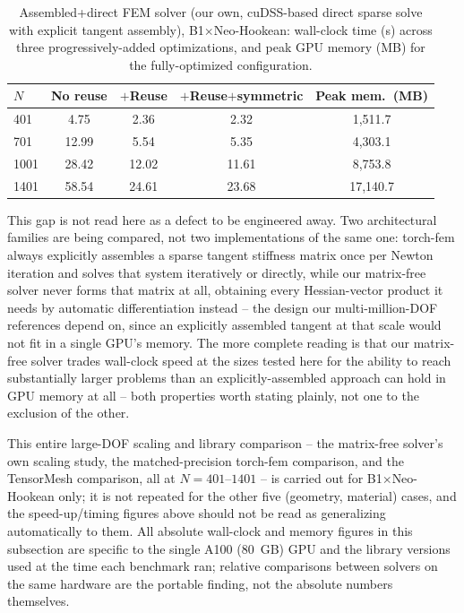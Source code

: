 \documentclass[final,5p,times]{elsarticle}
\begin{document}
\begin{table}[h]
\centering
\caption{Assembled+direct FEM solver (our own, cuDSS-based direct sparse
  solve with explicit tangent assembly), B1$\times$Neo-Hookean: wall-clock
  time (s) across three progressively-added optimizations, and peak GPU
  memory (MB) for the fully-optimized configuration.}
\label{tab:assembled-direct}
\footnotesize
\setlength{\tabcolsep}{3pt}
\begin{tabular}{lcccc}
\toprule
$N$ & No reuse & $+$Reuse & $+$Reuse$+$symmetric & Peak mem.\ (MB) \\
\midrule
401  & 4.75  & 2.36  & 2.32  & 1{,}511.7 \\
701  & 12.99 & 5.54  & 5.35  & 4{,}303.1 \\
1001 & 28.42 & 12.02 & 11.61 & 8{,}753.8 \\
1401 & 58.54 & 24.61 & 23.68 & 17{,}140.7 \\
\bottomrule
\end{tabular}
\end{table}

This gap is not read here as a defect to be engineered away. Two
architectural families are being compared, not two implementations of the
same one: torch-fem always explicitly assembles a sparse tangent
stiffness matrix once per Newton iteration and solves that system
iteratively or directly, while our matrix-free solver never forms that
matrix at all, obtaining every Hessian-vector product it needs by
automatic differentiation instead -- the design our
multi-million-DOF references depend on, since an explicitly assembled
tangent at that scale would not fit in a single GPU's memory. The more
complete reading is that our matrix-free solver trades wall-clock speed
at the sizes tested here for the ability to reach substantially larger
problems than an explicitly-assembled approach can hold in GPU memory at
all -- both properties worth stating plainly, not one to the exclusion of
the other.

This entire large-DOF scaling and library comparison -- the matrix-free
solver's own scaling study, the matched-precision torch-fem comparison,
and the TensorMesh comparison, all at $N{=}401$--$1401$ -- is carried out
for B1$\times$Neo-Hookean only; it is not repeated for the other five
(geometry, material) cases, and the speed-up/timing figures above should
not be read as generalizing automatically to them. All absolute wall-clock
and memory figures in this subsection are specific to the single A100
(80~GB) GPU and the library versions used at the time each benchmark ran;
relative comparisons between solvers on the same hardware are the
portable finding, not the absolute numbers themselves.
\end{document}
